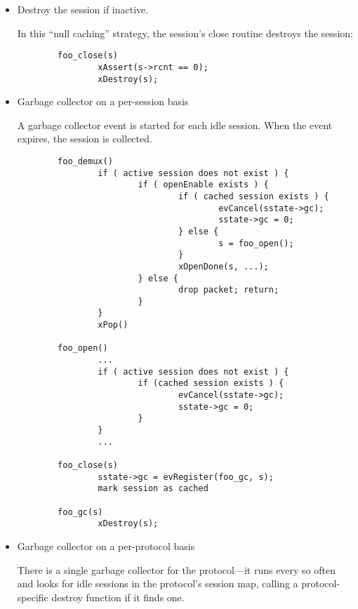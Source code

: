 \begin{itemize}

\item{}
Destroy the session if inactive.  

In this ``null caching'' strategy, the session's close routine
destroys the session:

\begin{verbatim}
        foo_close(s)
                xAssert(s->rcnt == 0);
                xDestroy(s);
\end{verbatim}


\item{}
Garbage collector on a per-session basis

A garbage collector event is started for each idle session.  When
the event expires, the session is collected.  

\let\tt=\COURIERtt
\begin{verbatim}
        foo_demux()
                if ( active session does not exist ) {	
                        if ( openEnable exists ) {
                                if ( cached session exists ) {
                                        evCancel(sstate->gc);
                                        sstate->gc = 0;
                                } else {
                                        s = foo_open();
                                }
                                xOpenDone(s, ...);
                        } else {
                                drop packet; return;
                        }
                }
                xPop()

        foo_open()
                ...
                if ( active session does not exist ) {
                        if (cached session exists ) {		
                                evCancel(sstate->gc);
                                sstate->gc = 0;
                        }
                }
                ...
        
        foo_close(s)
                sstate->gc = evRegister(foo_gc, s);
                mark session as cached

        foo_gc(s)
                xDestroy(s);
\end{verbatim}
\let\tt=\CMRtt

\item{}
Garbage collector on a per-protocol basis

    There is a single garbage collector for the protocol---it runs
    every so often and looks for idle sessions in the protocol's
    session map, calling a protocol-specific destroy function if it
    finds one.  


\end{itemize}
